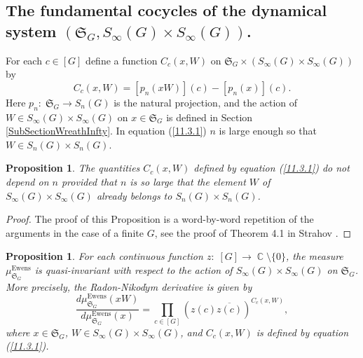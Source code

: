 \documentclass[12pt]{amsart}
\newtheorem{prop}[thm]{Proposition}
\theoremstyle{definition}
\numberwithin{equation}{section}
\DeclareMathOperator{\C}{\mathbb{C}}
\DeclareMathOperator{\Ewens}{Ewens}
\begin{document}
\subsection{The fundamental cocycles of the dynamical system $\left(\mathfrak{S}_G,S_{\infty}(G)\times S_{\infty}(G)\right)$.}
For each $c\in[G]$ define a function $C_c(x,W)$ on $\mathfrak{S}_G\times\left(S_{\infty}(G)\times S_{\infty}(G)\right)$ by
\begin{equation}\label{11.3.1}
C_c(x,W)=\left[p_n(xW)\right](c)-\left[p_n(x)\right](c).
\end{equation}
Here $p_n:\;\mathfrak{S}_G\longrightarrow S_n(G)$ is the natural projection, and the
action of $W\in S_{\infty}(G)\times S_{\infty}(G)$ on $x\in\mathfrak{S}_G$ is defined in Section
\ref{SubSectionWreathInfty}. In equation (\ref{11.3.1}) $n$ is large enough so that $W\in S_n(G)\times S_n(G)$.
\begin{prop}\label{Prop4.2} The quantities $C_c(x,W)$ defined by equation (\ref{11.3.1}) do not depend on $n$ provided that $n$ is so large that the element $W$ of $S_{\infty}(G)\times S_{\infty}(G)$
already belongs to $S_n(G)\times S_n(G)$.
\end{prop}
\begin{proof} The proof of this Proposition is a word-by-word repetition of the arguments in the case of a finite $G$, see the proof of Theorem 4.1 in Strahov \cite{StrahovIsr25}.
\end{proof}
\begin{prop}\label{Prop12.1.1}
For each continuous function $z:\; [G]\longrightarrow\C\setminus\{0\}$,
the measure $\mu_{\mathfrak{S}_G}^{\Ewens}$ is quasi-invariant with respect to the action of $S_{\infty}(G)\times S_{\infty}(G)$ on $\mathfrak{S}_G$. More precisely,
the Radon-Nikod$\acute{y}$m derivative is given by
\begin{equation}
\frac{d\mu^{\Ewens}_{\mathfrak{S}_G}(xW)}{d\mu_{\mathfrak{S}_G}^{\Ewens}(x)}=\prod\limits_{c\in [G]}\left(z(c)\overline{z(c)}\right)^{C_c(x,W)},
\end{equation}
where $x\in\mathfrak{S}_G$, $W\in S_{\infty}(G)\times S_{\infty}(G)$, and $C_c(x,W)$ is defined by equation  (\ref{11.3.1}).
\end{prop}
\end{document}
